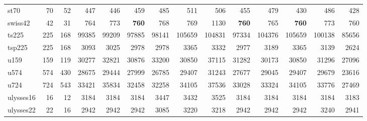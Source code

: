{\begin{longtable}{l r r r r r r r r r r r r r}
st70 & 70 & 52 & 447 & 446 & 459 & 485 & 511 & 506 & 455 & 479 & 430 & 486 & 428 \\
swiss42 & 42 & 31 & 764 & 773 & \textbf{760} & 768 & 769 & 1130 & \textbf{760} & 765 & \textbf{760} & 773 & 760 \\
ts225 & 225 & 168 & 99385 & 99209 & 97885 & 98141 & 105659 & 104831 & 97334 & 104376 & 105659 & 100138 & 85656 \\
tsp225 & 225 & 168 & 3093 & 3025 & 2978 & 2978 & 3365 & 3332 & 2977 & 3189 & 3365 & 3139 & 2624 \\
u159 & 159 & 119 & 30277 & 32821 & 30876 & 33200 & 30850 & 37115 & 31282 & 30173 & 30850 & 31296 & 27096 \\
u574 & 574 & 430 & 28675 & 29444 & 27999 & 26785 & 29407 & 31243 & 27677 & 29045 & 29407 & 29679 & 23616 \\
u724 & 724 & 543 & 33421 & 35834 & 32458 & 32258 & 34105 & 37536 & 33028 & 33324 & 34105 & 33776 & 27469 \\
ulysses16 & 16 & 12 & 3184 & 3184 & 3184 & 3447 & 3432 & 3525 & 3184 & 3184 & 3184 & 3184 & 3183 \\
ulysses22 & 22 & 16 & 2942 & 2942 & 2942 & 3085 & 3220 & 3218 & 2942 & 2942 & 2942 & 3240 & 2941 \\
\end{longtable}}
